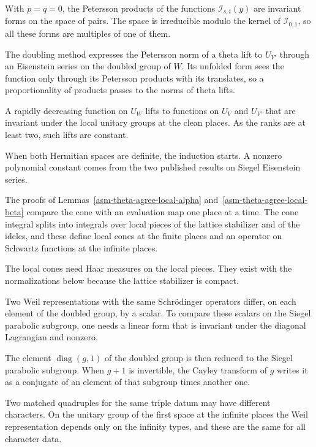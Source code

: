 With $p=q=0$, the Petersson products of the functions $\mathcal I_{s,t}(y)$ are
invariant forms on the space of pairs. The space is irreducible modulo the
kernel of $\mathcal I_{0,1}$, so all these forms are multiples of one of them.

The doubling method expresses the Petersson norm of a theta lift to $U_{V'}$
through an Eisenstein series on the doubled group of $W$. Its unfolded form
sees the function only through its Petersson products with its translates, so
a proportionality of products passes to the norms of theta lifts.

A rapidly decreasing function on $U_W$ lifts to functions on $U_V$ and
$U_{V'}$ that are invariant under the local unitary groups at the clean
places. As the ranks are at least two, such lifts are constant.

When both Hermitian spaces are definite, the induction starts. A nonzero
polynomial constant comes from the two published results on Siegel
Eisenstein series.

The proofs of Lemmas~\ref{asm-theta-agree-local-alpha}
and~\ref{asm-theta-agree-local-beta} compare the cone with an evaluation map
one place at a time. The cone integral splits into integrals over local
pieces of the lattice stabilizer and of the ideles, and these define local
cones at the finite places and an operator on Schwartz functions at the
infinite places.

The local cones need Haar measures on the local pieces. They exist with the
normalizations below because the lattice stabilizer is compact.

Two Weil representations with the same Schrödinger operators differ, on each
element of the doubled group, by a scalar. To compare these scalars on the
Siegel parabolic subgroup, one needs a linear form that is invariant under the
diagonal Lagrangian and nonzero.

The element $\operatorname{diag}(g,1)$ of the doubled group is then reduced to
the Siegel parabolic subgroup. When $g+1$ is invertible, the Cayley transform
of $g$ writes it as a conjugate of an element of that subgroup times another
one.

Two matched quadruples for the same triple datum may have different
characters. On the unitary group of the first space at the infinite places
the Weil representation depends only on the infinity types, and these are the
same for all character data.

